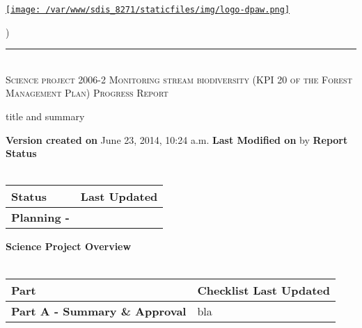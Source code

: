 \documentclass[version=last, paper=a4, DIV=18, usenames, dvipsnames]{scrartcl}
\newcommand{\HRule}{\rule{\linewidth}{0.1pt}}
\begin{document}
\setcounter{secnumdepth}{-1}


\begin{titlepage}
\begin{center}
\begin{minipage}[t]{0.28\textwidth}
\begin{flushleft}
\href{http://www.dpaw.wa.gov.au}{\texttt{[image: /var/www/sdis\_8271/staticfiles/img/logo-dpaw.png]}}
\end{flushleft}
\end{minipage}
\begin{minipage}[b]{0.7\textwidth}
\begin{flushright}
    \href{http://sdis.dpaw.wa.gov.au/documents/progressreport/1209/download/}{}) \\
\end{flushright}
\end{minipage}
\HRule \\[0.4cm]
\vfill
\textsc{\Huge Science project 2006-2 Monitoring stream biodiversity (KPI 20 of the Forest Management Plan) \newline }
\vfill
\textsc{\Huge Progress Report}

\vfill\vfill\vfill\vfill
title and summary

\vfill\vfill\vfill\vfill\vfill\vfill\vfill\vfill

\textbf{Version created on} June 23, 2014, 10:24 a.m.
\vfill
\textbf{Last Modified on}  by 
\vfill\vfill
\textbf{Report Status}\\\,
\begin{tabu} to \linewidth { | X[l] | X | }
\hline
{}
Status & Last Updated \\
\hline
\textbf{Planning - } \\
\hline
\end{tabu}
\vfill
\textbf{Science Project Overview}\\\,
\begin{tabu} to \linewidth { | X[l] | X | }
\hline
{}
Part & Checklist Last Updated \\
\hline
\textbf{Part A - Summary \& Approval} & bla \\
\hline
\end{tabu}

\end{center}
\end{titlepage}

\setcounter{tocdepth}{2}
\tableofcontents
\clearpage
\end{document}
